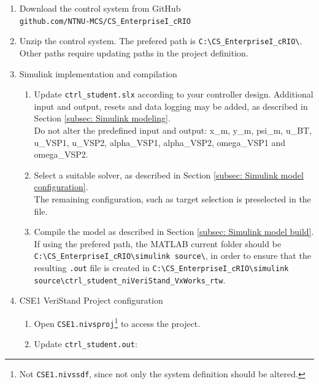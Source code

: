 \documentclass[a4paper,twoside,english]{report}
\begin{document}
\begin{enumerate}
\item Download the control system from GitHub\\
{\texttt{github.com/NTNU-MCS/CS\_EnterpriseI\_cRIO}} 
\item Unzip the control system. The prefered path is \texttt{C:\textbackslash{}CS\_EnterpriseI\_cRIO\textbackslash{}}.
Other paths require updating paths in the project definition.
\item Simulink implementation and compilation

\begin{enumerate}
\item Update {\texttt{ctrl\_student.slx}} according to your controller
design. Additional input and output, resets and data logging may be
added, as described in Section \ref{subsec: Simulink modeling}.\\
Do not alter the predefined input and output: x\_m, y\_m, psi\_m,
u\_BT, u\_VSP1, u\_VSP2, alpha\_VSP1, alpha\_VSP2, omega\_VSP1 and
omega\_VSP2.
\item Select a suitable solver, as described in Section \ref{subsec: Simulink model configuration}.\\
The remaining configuration, such as target selection is preselected
in the file.
\item Compile the model as described in Section \ref{subsec: Simulink model build}.
If using the prefered path, the MATLAB current folder should be \texttt{C:\textbackslash{}CS\_EnterpriseI\_cRIO\textbackslash{}simulink
source\textbackslash{}}, in order to ensure that the resulting \texttt{.out}
file is created in \texttt{C:\textbackslash{}CS\_EnterpriseI\_cRIO\textbackslash{}simulink
source\textbackslash{}ctrl\_student\_niVeriStand\_VxWorks\_rtw}.
\end{enumerate}
\item CSE1 VeriStand Project configuration

\begin{enumerate}
\item Open {\texttt{CSE1.nivsproj}}\footnote{Not \texttt{CSE1.nivssdf}, since not only the system definition should
be altered.} to access the project.
\item Update {\texttt{ctrl\_student.out}}:


\end{enumerate}
\end{enumerate}
\end{document}
